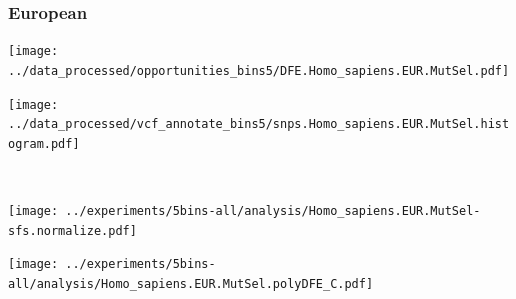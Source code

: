 \subsubsection{European}

\begin{minipage}{0.49\linewidth}
    \texttt{[image: ../data\_processed/opportunities\_bins5/DFE.Homo\_sapiens.EUR.MutSel.pdf]}
\end{minipage}
\begin{minipage}{0.49\linewidth}
    \texttt{[image: ../data\_processed/vcf\_annotate\_bins5/snps.Homo\_sapiens.EUR.MutSel.histogram.pdf]}
\end{minipage}
\\
\begin{minipage}{0.49\linewidth}
    \texttt{[image: ../experiments/5bins-all/analysis/Homo\_sapiens.EUR.MutSel-sfs.normalize.pdf]}
\end{minipage}
\begin{minipage}{0.4\linewidth}
    \texttt{[image: ../experiments/5bins-all/analysis/Homo\_sapiens.EUR.MutSel.polyDFE\_C.pdf]}
\end{minipage}
